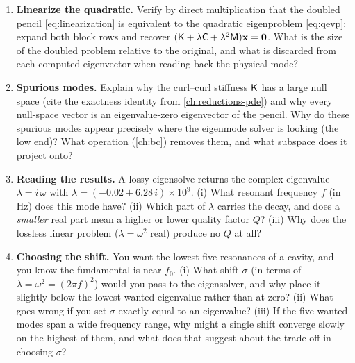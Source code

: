 \begin{enumerate}[nosep]
  in which does it write only the apply?
  \item \textbf{Linearize the quadratic.} Verify by direct multiplication that the
  doubled pencil \cref{eq:linearization} is equivalent to the quadratic
  eigenproblem \cref{eq:qevp}: expand both block rows and recover
  $(\mathsf{K}+\lambda\mathsf{C}+\lambda^2\mathsf{M})\mathbf{x}=\mathbf 0$. What is the size of the doubled
  problem relative to the original, and what is discarded from each computed
  eigenvector when reading back the physical mode?
  \item \textbf{Spurious modes.} Explain why the curl--curl stiffness $\mathsf{K}$ has a
  large null space (cite the exactness identity from \cref{ch:reductions-pde}) and
  why every null-space vector is an eigenvalue-zero eigenvector of the pencil. Why
  do these spurious modes appear precisely where the eigenmode solver is looking
  (the low end)? What operation (\cref{ch:bc}) removes them, and what subspace does
  it project onto?
  \item \textbf{Reading the results.} A lossy eigensolve returns the complex
  eigenvalue $\lambda = i\,\omega$ with $\lambda = (-0.02 + 6.28\,i)\times10^{9}$.
  (i) What resonant frequency $f$ (in Hz) does this mode have? (ii) Which part of
  $\lambda$ carries the decay, and does a \emph{smaller} real part mean a higher or
  lower quality factor $Q$? (iii) Why does the lossless linear problem
  ($\lambda=\omega^2$ real) produce no $Q$ at all?
  \item \textbf{Choosing the shift.} You want the lowest five resonances of a
  cavity, and you know the fundamental is near $f_0$. (i) What shift $\sigma$ (in
  terms of $\lambda=\omega^2=(2\pi f)^2$) would you pass to the eigensolver, and
  why place it slightly below the lowest wanted eigenvalue rather than at zero?
  (ii) What goes wrong if you set $\sigma$ exactly equal to an eigenvalue? (iii) If
  the five wanted modes span a wide frequency range, why might a single shift
  converge slowly on the highest of them, and what does that suggest about the
  trade-off in choosing $\sigma$?
\end{enumerate}
